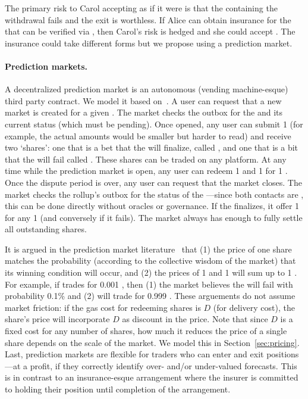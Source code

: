 The primary risk to Carol accepting \ethxx as if it were \ethone is that the \rblock containing the \ethxx withdrawal fails and the exit is worthless. If Alice can obtain insurance for the \ethxx that can be verified via \layerone, then Carol's risk is hedged and she could accept \ethxx. The insurance could take different forms but we propose using a prediction market.

\paragraph{Prediction markets.} A decentralized prediction market is an autonomous (\eg vending machine-esque) third party \layerone contract. We model it based on~\cite{clark2014decentralizing}. A user can request that a new market is created for a given \rblock. The market checks the outbox for the \rblock and its current status (which must be pending). Once opened, any user can submit 1 \ethone (for example, the actual amounts would be smaller but harder to read) and receive two `shares': one that is a bet that the \rblock will finalize, called \final, and one that is a bit that the \rblock will fail called \fail. These shares can be traded on any platform. At any time while the prediction market is open, any user can redeem 1 \final and 1 \fail for 1 \ethone. Once the dispute period is over, any user can request that the market closes. The market checks the rollup's outbox for the status of the \rblock---since both contacts are \layerone, this can be done directly without oracles or governance. If the \rblock finalizes, it offer 1 \ethone for any 1 \final (and conversely if it fails). The market always has enough \ethone to fully settle all outstanding shares.

It is argued in the prediction market literature~\cite{clark2014decentralizing} that (1) the price of one share matches the probability (according to the collective wisdom of the market) that its winning condition will occur, and (2) the prices of 1 \final and 1 \fail will sum up to 1 \ethone. For example, if \fail trades for 0.001 \ethone, then (1) the market believes the \rblock will fail with probability 0.1\% and (2) \final will trade for  0.999 \ethone. These arguements do not assume market friction: if the gas cost for redeeming shares is $D$ (for delivery cost), the share's price will incorporate $D$ as discount in the price. Note that since $D$ is a fixed cost for any number of shares, how much it reduces the price of a single share depends on the scale of the market. We model this in Section~\ref{sec:pricing}. Last, prediction markets are flexible for traders who can enter and exit positions---at a profit, if they correctly identify over- and/or under-valued forecasts. This is in contrast to an insurance-esque arrangement where the insurer is committed to holding their position until completion of the arrangement.

